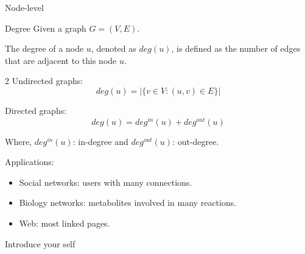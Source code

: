 \documentclass[aspectratio=169]{beamer}
\begin{document}
    \begin{frame}{Node-level}
        \begin{exampleblock}{Degree}
            Given a graph $G = (V, E)$.
            

            The degree of a node $u$, denoted as $deg(u)$, is defined as the number of edges that are adjacent to this node $u$.
        \end{exampleblock}

        \begin{multicols}{2} %
            Undirected graphs:
            \begin{equation}
                deg(u) = |\{v \in V : (u, v) \in E\}|
            \end{equation}
        
            Directed graphs:
            \begin{equation}
                deg(u) = deg^{in}(u) + deg^{out}(u)
            \end{equation}
        \end{multicols}
        
        Where, $deg^{in}(u)$: in-degree and $deg^{out}(u)$: out-degree. \newline

        Applications:
        \begin{itemize}
            \item Social networks: users with many connections.
            \item Biology networks: metabolites involved in many reactions.
            \item Web: most linked pages.
        \end{itemize}

        \begin{note}
            {Introduce your self}
        \end{note}
    \end{frame}
\end{document}
